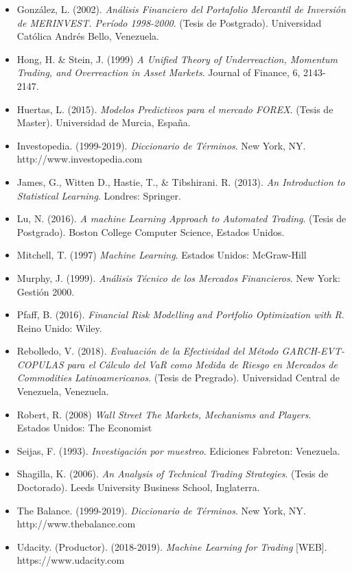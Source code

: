 \documentclass[a4paper,12pt]{Latex/Classes/PhDthesisPSnPDF}
\begin{document}
\begin{itemize}
\item González, L. (2002). \textit{Análisis Financiero del Portafolio Mercantil de Inversión de MERINVEST. Período 1998-2000}. (Tesis de Postgrado). Universidad Católica Andrés Bello, Venezuela.

\item Hong, H. \& Stein, J. (1999) \textit{A Unified Theory of Underreaction, Momentum Trading, and Overreaction in Asset Markets}. Journal of Finance, 6, 2143-2147.

\item Huertas, L. (2015). \textit{Modelos Predictivos para el mercado FOREX}. (Tesis de Master). Universidad de Murcia, España.

\item Investopedia. (1999-2019). \textit{Diccionario de Términos}. New York, NY. http://www.investopedia.com

\item James, G., Witten D., Hastie, T., \& Tibshirani. R. (2013). \textit{An Introduction to Statistical Learning}. Londres: Springer.

\item Lu, N. (2016). \textit{A machine Learning Approach to Automated Trading}. (Tesis de Postgrado). Boston College Computer Science, Estados Unidos.

\item Mitchell, T. (1997) \textit{Machine Learning}. Estados Unidos: McGraw-Hill

\item Murphy, J. (1999). \textit{Análisis Técnico de los Mercados Financieros}. New York: Gestión 2000.

\item Pfaff, B. (2016). \textit{Financial Risk Modelling and Portfolio Optimization with R}. Reino Unido: Wiley.

\item Rebolledo, V. (2018). \textit{Evaluación de la Efectividad del Método GARCH-EVT-COPULAS para el Cálculo del VaR como Medida de Riesgo en Mercados de Commodities Latinoamericanos}. (Tesis de Pregrado). Universidad Central de Venezuela, Venezuela.

\item Robert, R. (2008) \textit{Wall Street The Markets, Mechanisms and Players}. Estados Unidos: The Economist

\item Seijas, F. (1993). \textit{Investigación por muestreo}. Ediciones Fabreton: Venezuela.

\item Shagilla, K. (2006). \textit{An Analysis of Technical Trading Strategies}. (Tesis de Doctorado). Leeds University Business School, Inglaterra.

\item The Balance. (1999-2019). \textit{Diccionario de Términos}. New York, NY. http://www.thebalance.com

\item Udacity. (Productor). (2018-2019). \textit{Machine Learning for Trading} [WEB]. https://www.udacity.com

\end{itemize}
\end{document}
